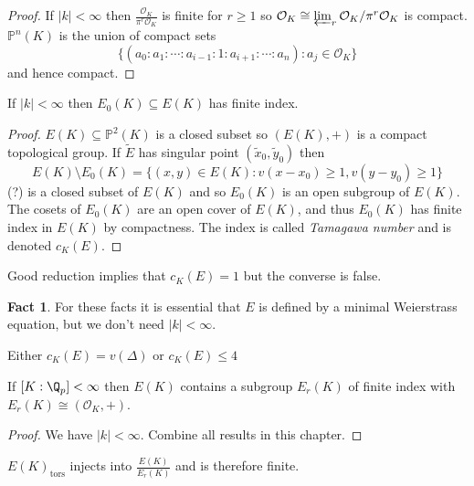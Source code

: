 \documentclass[a4paper]{article}
\theoremstyle{definition}
\newtheorem*{fact}{Fact}
\renewcommand*{\P}{\mathbb{P}}
\renewcommand*{\O}{\mathcal{O}}
\begin{document}
\begin{proof}
  If \(|k| < \infty\) then \(\frac{\O_K}{\pi^r \O_K}\) is finite for \(r \geq 1\) so \(\O_K \cong \varprojlim_r \O_K/\pi^r \O_K\) is compact. \(\P^n(K)\) is the union of compact sets
  \[
    \{(a_0: a_1: \cdots : a_{i - 1}: 1 : a_{i + 1}: \cdots: a_n): a_j \in \O_K\}
  \]
  and hence compact.
\end{proof}

\begin{lemma}
  If \(|k| < \infty\) then \(E_0(K) \subseteq E(K)\) has finite index.
\end{lemma}

\begin{proof}
  \(E(K) \subseteq \P^2(K)\) is a closed subset so \((E(K), +)\) is a compact topological group. If \(\widetilde E\) has singular point \((\tilde x_0, \tilde y_0)\) then
  \[
    E(K) \setminus E_0(K) = \{(x, y) \in E(K): v(x - x_0) \geq 1, v(y - y_0) \geq 1\}
  \]
  (?) is a closed subset of \(E(K)\) and so \(E_0(K)\) is an open subgroup of \(E(K)\). The cosets of \(E_0(K)\) are an open cover of \(E(K)\), and thus \(E_0(K)\) has finite index in \(E(K)\) by compactness. The index is called \emph{Tamagawa number} and is denoted \(c_K(E)\).
\end{proof}

\begin{remark}
  Good reduction implies that \(c_K(E) = 1\) but the converse is false.
\end{remark}

\begin{fact}
  For these facts it is essential that \(E\) is defined by a minimal Weierstrass equation, but we don't need \(|k| < \infty\).

  Either \(c_K(E) = v(\Delta)\) or \(c_K(E) \leq 4\)
\end{fact}

\begin{theorem}
  If \([K: \Q_p] < \infty\) then \(E(K)\) contains a subgroup \(E_r(K)\) of finite index with \(E_r(K) \cong (\O_K, +)\).
\end{theorem}

\begin{proof}
  We have \(|k| < \infty\). Combine all results in this chapter.
\end{proof}

\begin{corollary}
  \(E(K)_{\mathrm{tors}}\) injects into \(\frac{E(K)}{E_r(K)}\) and is therefore finite.
\end{corollary}
\end{document}
